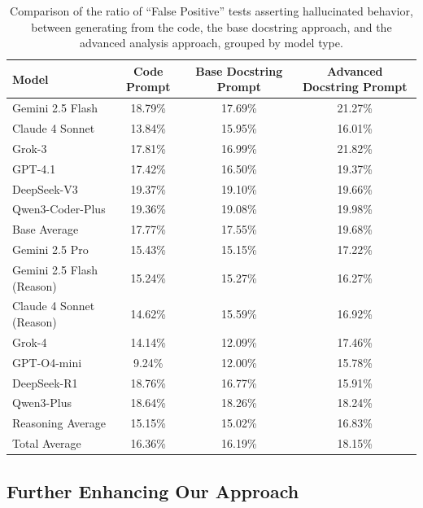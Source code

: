 \documentclass[acmsmall]{acmart}
\begin{document}
\begin{table}[htbp!]
\centering
\tiny
\caption{Comparison of the ratio of ``False Positive'' tests asserting hallucinated behavior, between generating from the code, the base docstring approach, and the advanced analysis approach, grouped by model type.}
\label{tab:advanced_docstring_fail_on_both}
\begin{tabular}{l|c|c|c}
\toprule
\textbf{Model} & \textbf{Code Prompt} & \textbf{Base Docstring Prompt} & \textbf{Advanced Docstring Prompt} \\
\midrule
Gemini 2.5 Flash & 18.79\% & 17.69\% & 21.27\% \\
Claude 4 Sonnet & 13.84\% & 15.95\% & 16.01\% \\
Grok-3 & 17.81\% & 16.99\% & 21.82\% \\
GPT-4.1 & 17.42\% & 16.50\% & 19.37\% \\
DeepSeek-V3 & 19.37\% & 19.10\% & 19.66\% \\
Qwen3-Coder-Plus & 19.36\% & 19.08\% & 19.98\% \\
\midrule
Base Average & 17.77\% & 17.55\% & 19.68\% \\
\midrule
\midrule
Gemini 2.5 Pro & 15.43\% & 15.15\% & 17.22\% \\
Gemini 2.5 Flash (Reason) & 15.24\% & 15.27\% & 16.27\% \\
Claude 4 Sonnet (Reason) & 14.62\% & 15.59\% & 16.92\% \\
Grok-4 & 14.14\% & 12.09\% & 17.46\% \\
GPT-O4-mini & 9.24\% & 12.00\% & 15.78\% \\
DeepSeek-R1 & 18.76\% & 16.77\% & 15.91\% \\
Qwen3-Plus & 18.64\% & 18.26\% & 18.24\% \\
\midrule
Reasoning Average & 15.15\% & 15.02\% & 16.83\% \\
\midrule
Total Average & 16.36\% & 16.19\% & 18.15\% \\
\bottomrule
\end{tabular}
\end{table}

\subsection{Further Enhancing Our Approach}
\label{subsec:enhanced_approach}
\end{document}
